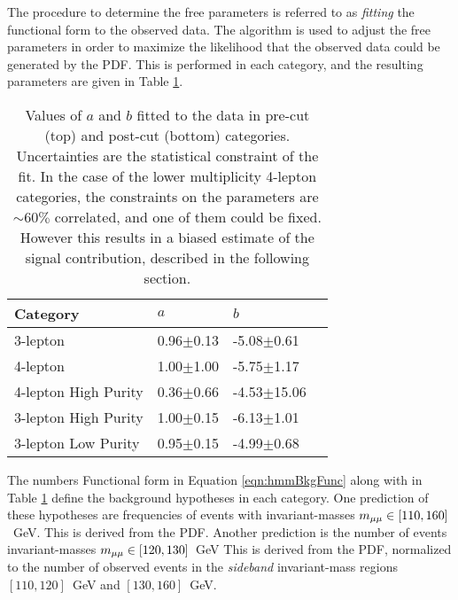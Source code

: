 The procedure to determine the free parameters is referred to as \emph{fitting} the functional form to the observed data.
The  algorithm is used to adjust the free parameters in order to maximize the likelihood that the observed data could be generated by the PDF.
This is performed in each category, and the resulting parameters are given in Table \ref{tab:hmmBkgFitParams}.

\begin{table}[htp]
\begin{center}
\begin{tabular}{l l l l}
\toprule
Category & $a$ & $b$ \\
\midrule
3-lepton & 0.96$\pm$0.13 & -5.08$\pm$0.61 \\
4-lepton & 1.00$\pm$1.00 & -5.75$\pm$1.17 \\
\midrule
4-lepton High Purity & 0.36$\pm$0.66 & -4.53$\pm$15.06 \\
3-lepton High Purity & 1.00$\pm$0.15 & -6.13$\pm$1.01 \\
3-lepton Low Purity  & 0.95$\pm$0.15 & -4.99$\pm$0.68 \\
\bottomrule
\end{tabular}
\caption{Values of $a$ and $b$ fitted to the data in pre-cut (top) and post-cut (bottom) categories. Uncertainties are the statistical constraint of the fit. In the case of the lower multiplicity 4-lepton categories, the constraints on the parameters are $\sim60\%$ correlated, and one of them could be fixed. However this results in a biased estimate of the signal contribution, described in the following section.}
\label{tab:hmmBkgFitParams}
\end{center}
\end{table}

The numbers Functional form in Equation \ref{eqn:hmmBkgFunc} along with in Table \ref{tab:hmmBkgFitParams} define the background hypotheses in each category.
One prediction of these hypotheses are frequencies of events with invariant-masses $m_{\mu\mu}\in[110,160]$~GeV.
This is derived from the PDF.
Another prediction is the number of events invariant-masses $m_{\mu\mu}\in[120,130]$~GeV
This is derived from the PDF, normalized to the number of observed events in the \emph{sideband} invariant-mass regions $[110,120]$~GeV and $[130,160]$~GeV.
